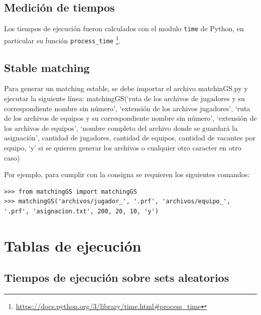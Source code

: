 \documentclass[article,a4paper]{article}
\begin{document}
\subsection{Medición de tiempos}
 Los tiempos de ejecución fueron calculados con el modulo \texttt{time} de Python, en particular su función \texttt{process\_time} \footnote{\url{https://docs.python.org/3/library/time.html\#process\_time}}.

\subsection{Stable matching}
 Para generar un matching estable, se debe importar el archivo matchinGS.py y ejecutar la siguiente línea:
matchingGS(‘ruta de los archivos  de jugadores y su correspondiente nombre sin número’, ‘extensión de los archivos jugadores’, ‘ruta de los archivos de equipos y su correspondiente nombre sin número’, ‘extensión de los archivos de equipos’, ‘nombre completo del archivo donde se guardará la asignación’, cantidad de jugadores, cantidad de equipos, cantidad de vacantes por equipo, ‘y’ si se quieren generar los archivos o cualquier otro caracter en otro caso)

Por ejemplo, para cumplir con la consigna se requieren los siguientes comandos:

\begin{verbatim}
>>> from matchingGS import matchingGS
>>> matchingGS('archivos/jugador_', '.prf', 'archivos/equipo_', '.prf', 'asignacion.txt', 200, 20, 10, 'y')
\end{verbatim}

\section{Tablas de ejecución}

\subsection{Tiempos de ejecución sobre sets aleatorios}
\end{document}

